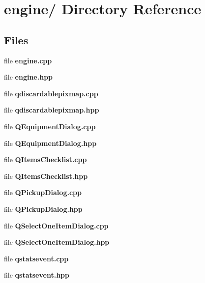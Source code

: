 \section{engine/ Directory Reference}
\label{dir_000002}
\subsection*{Files}
\begin{CompactItemize}
\item 
file {\bf engine.cpp}
\item 
file {\bf engine.hpp}
\item 
file {\bf qdiscardablepixmap.cpp}
\item 
file {\bf qdiscardablepixmap.hpp}
\item 
file {\bf QEquipment\-Dialog.cpp}
\item 
file {\bf QEquipment\-Dialog.hpp}
\item 
file {\bf QItems\-Checklist.cpp}
\item 
file {\bf QItems\-Checklist.hpp}
\item 
file {\bf QPickup\-Dialog.cpp}
\item 
file {\bf QPickup\-Dialog.hpp}
\item 
file {\bf QSelect\-One\-Item\-Dialog.cpp}
\item 
file {\bf QSelect\-One\-Item\-Dialog.hpp}
\item 
file {\bf qstatsevent.cpp}
\item 
file {\bf qstatsevent.hpp}
\end{CompactItemize}
